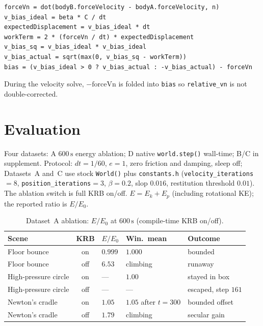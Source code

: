 \documentclass{jcgt}
\begin{document}
\begin{lstlisting}[caption={Distance-joint \texttt{preSolve} bias (Component A + B).},label={lst:joint}]
forceVn = dot(bodyB.forceVelocity - bodyA.forceVelocity, n)
v_bias_ideal = beta * C / dt
expectedDisplacement = v_bias_ideal * dt
workTerm = 2 * (forceVn / dt) * expectedDisplacement
v_bias_sq = v_bias_ideal * v_bias_ideal
v_bias_actual = sqrt(max(0, v_bias_sq - workTerm))
bias = (v_bias_ideal > 0 ? v_bias_actual : -v_bias_actual) - forceVn
\end{lstlisting}

During the velocity solve, $-\mathrm{forceVn}$ is folded into \texttt{bias} so \texttt{relative\_vn} is not double-corrected.

\section{Evaluation}
\label{sec:evaluation}

Four datasets: A $600\,\mathrm{s}$ energy ablation; D native \texttt{world.step()} wall-time; B/C in supplement. Protocol: $dt = 1/60$, $e = 1$, zero friction and damping, sleep off; Datasets~A and~C use stock \texttt{World()} plus \texttt{constants.h} (\texttt{velocity\_iterations}$=8$, \texttt{position\_iterations}$=3$, $\beta = 0.2$, slop $0.016$, restitution threshold $0.01$). The ablation switch is full KRB on/off. $E = E_k + E_p$ (including rotational KE); the reported ratio is $E/E_0$.

\small
\begin{table}[htb]
  \caption{Dataset~A ablation: $E/E_0$ at $600\,\mathrm{s}$ (compile-time KRB on/off).}
  \label{tab:dataset-a}
  \centering
  \begin{tabular}{@{}lclll@{}}
    \hline
    Scene & KRB & $E/E_0$ & Win.\ mean & Outcome \\
    \hline
    Floor bounce & on & $0.999$ & $1.000$ & bounded \\
    Floor bounce & off & $6.53$ & climbing & runaway \\
    High-pressure circle & on & --- & $1.00$ & stayed in box \\
    High-pressure circle & off & --- & --- & escaped, step $161$ \\
    Newton's cradle & on & $1.05$ & $1.05$ after $t=300$ & bounded offset \\
    Newton's cradle & off & $1.79$ & climbing & secular gain \\
    \hline
  \end{tabular}
\end{table}
\end{document}
